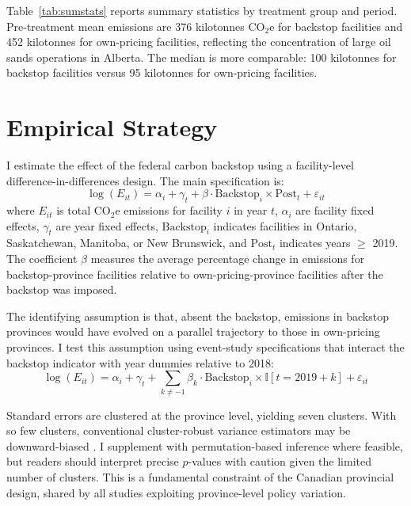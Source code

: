 \documentclass[12pt]{article}
\newcommand{\ind}{\mathbb{I}}
\begin{document}


Table~\ref{tab:sumstats} reports summary statistics by treatment group and period. Pre-treatment mean emissions are 376 kilotonnes CO$_2$e for backstop facilities and 452 kilotonnes for own-pricing facilities, reflecting the concentration of large oil sands operations in Alberta. The median is more comparable: 100 kilotonnes for backstop facilities versus 95 kilotonnes for own-pricing facilities.


\section{Empirical Strategy}

I estimate the effect of the federal carbon backstop using a facility-level difference-in-differences design. The main specification is:
\begin{equation}\label{eq:did}
    \log(E_{it}) = \alpha_i + \gamma_t + \beta \cdot \text{Backstop}_i \times \text{Post}_t + \varepsilon_{it}
\end{equation}
where $E_{it}$ is total CO$_2$e emissions for facility $i$ in year $t$, $\alpha_i$ are facility fixed effects, $\gamma_t$ are year fixed effects, $\text{Backstop}_i$ indicates facilities in Ontario, Saskatchewan, Manitoba, or New Brunswick, and $\text{Post}_t$ indicates years $\geq$ 2019. The coefficient $\beta$ measures the average percentage change in emissions for backstop-province facilities relative to own-pricing-province facilities after the backstop was imposed.

The identifying assumption is that, absent the backstop, emissions in backstop provinces would have evolved on a parallel trajectory to those in own-pricing provinces. I test this assumption using event-study specifications that interact the backstop indicator with year dummies relative to 2018:
\begin{equation}\label{eq:es}
    \log(E_{it}) = \alpha_i + \gamma_t + \sum_{k \neq -1} \beta_k \cdot \text{Backstop}_i \times \ind[t = 2019 + k] + \varepsilon_{it}
\end{equation}

Standard errors are clustered at the province level, yielding seven clusters. With so few clusters, conventional cluster-robust variance estimators may be downward-biased \citep{cameron_gelbach_miller_2008}. I supplement with permutation-based inference where feasible, but readers should interpret precise $p$-values with caution given the limited number of clusters. This is a fundamental constraint of the Canadian provincial design, shared by all studies exploiting province-level policy variation.
\end{document}
